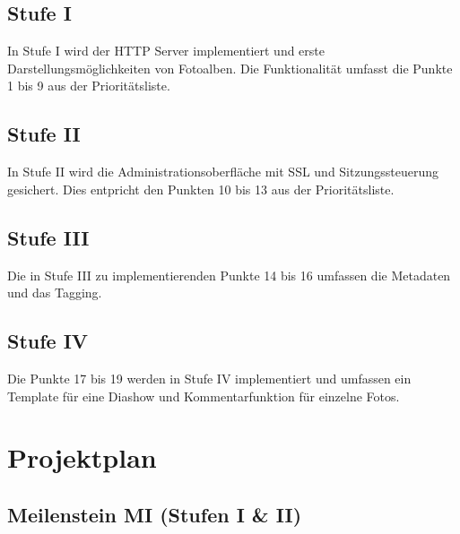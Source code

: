 \documentclass[a4paper,12pt,liststotocnumbered]{scrartcl}
\begin{document}
\subsection{Stufe I}

In Stufe I wird der HTTP Server implementiert und erste
Darstellungsmöglichkeiten von Fotoalben. Die Funktionalität umfasst die Punkte
1 bis 9 aus der Prioritätsliste.

\subsection{Stufe II}

In Stufe II wird die Administrationsoberfläche mit SSL und Sitzungssteuerung
gesichert. Dies entpricht den Punkten 10 bis 13 aus der Prioritätsliste.

\subsection{Stufe III}

Die in Stufe III zu implementierenden Punkte 14 bis 16 umfassen die Metadaten
und das Tagging.

\subsection{Stufe IV}

Die Punkte 17 bis 19 werden in Stufe IV implementiert und umfassen ein
Template für eine Diashow und Kommentarfunktion für einzelne Fotos.

\section{Projektplan}

\subsection{Meilenstein MI (Stufen I \& II)}
\end{document}
